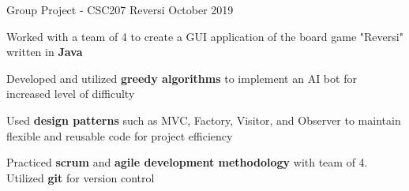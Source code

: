 \begin{cventries}
    \cventry
    {Group Project - CSC207} %
    {Reversi} %
    {} %
    {October 2019} %
    {
      \begin{cvitems} %
      	\item {Worked with a team of 4 to create a GUI application of the board game "Reversi" written in\textbf{ Java}}
        \item {Developed and utilized \textbf{greedy algorithms} to implement an AI bot for increased level of difficulty} 
        \item {Used \textbf{design patterns} such as MVC, Factory, Visitor, and Observer to maintain flexible and reusable code for project efficiency} 
		\item {Practiced \textbf{scrum} and \textbf{agile development methodology} with team of 4. Utilized \textbf{git} for version control}
      \end{cvitems}
    }
    
\end{cventries}